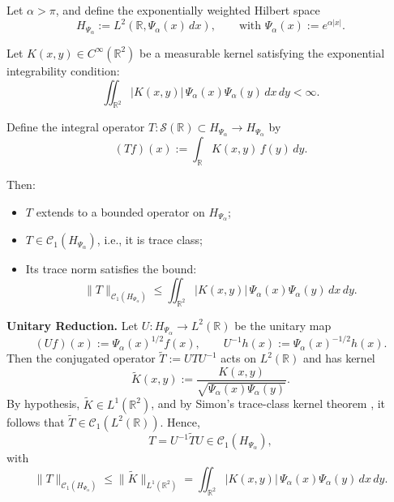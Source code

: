 \begin{lemma}
\label{lem:trace_class_via_weighted_L1}
Let \( \alpha > \pi \), and define the exponentially weighted Hilbert space
\[
H_{\Psi_\alpha} := L^2\left(\mathbb{R}, \Psi_\alpha(x)\, dx\right), \qquad \text{with } \Psi_\alpha(x) := e^{\alpha |x|}.
\]

Let \( K(x,y) \in C^\infty(\mathbb{R}^2) \) be a measurable kernel satisfying the exponential integrability condition:
\[
\iint_{\mathbb{R}^2} |K(x,y)|\, \Psi_\alpha(x) \Psi_\alpha(y)\, dx\, dy < \infty.
\]

Define the integral operator \( T \colon \mathcal{S}(\mathbb{R}) \subset H_{\Psi_\alpha} \to H_{\Psi_\alpha} \) by
\[
(Tf)(x) := \int_{\mathbb{R}} K(x,y)\, f(y)\, dy.
\]

Then:
\begin{itemize}
    \item \( T \) extends to a bounded operator on \( H_{\Psi_\alpha} \);
    \item \( T \in \mathcal{C}_1(H_{\Psi_\alpha}) \), i.e., it is trace class;
    \item Its trace norm satisfies the bound:
    \[
    \|T\|_{\mathcal{C}_1(H_{\Psi_\alpha})} \le \iint_{\mathbb{R}^2} |K(x,y)|\, \Psi_\alpha(x)\Psi_\alpha(y)\, dx\, dy.
    \]
\end{itemize}

\medskip
\noindent\textbf{Unitary Reduction.}
Let \( U \colon H_{\Psi_\alpha} \to L^2(\mathbb{R}) \) be the unitary map
\[
(Uf)(x) := \Psi_\alpha(x)^{1/2} f(x), \qquad U^{-1} h(x) := \Psi_\alpha(x)^{-1/2} h(x).
\]
Then the conjugated operator \( \widetilde{T} := U T U^{-1} \) acts on \( L^2(\mathbb{R}) \) and has kernel
\[
\widetilde{K}(x,y) := \frac{K(x,y)}{\sqrt{\Psi_\alpha(x)\Psi_\alpha(y)}}.
\]
By hypothesis, \( \widetilde{K} \in L^1(\mathbb{R}^2) \), and by Simon’s trace-class kernel theorem \cite[Thm.~4.2]{Simon2005TraceIdeals}, it follows that \( \widetilde{T} \in \mathcal{C}_1(L^2(\mathbb{R})) \). Hence,
\[
T = U^{-1} \widetilde{T} U \in \mathcal{C}_1(H_{\Psi_\alpha}),
\]
with
\[
\|T\|_{\mathcal{C}_1(H_{\Psi_\alpha})} \le \| \widetilde{K} \|_{L^1(\mathbb{R}^2)} = \iint_{\mathbb{R}^2} |K(x,y)|\, \Psi_\alpha(x)\Psi_\alpha(y)\, dx\, dy.
\]
\end{lemma}
